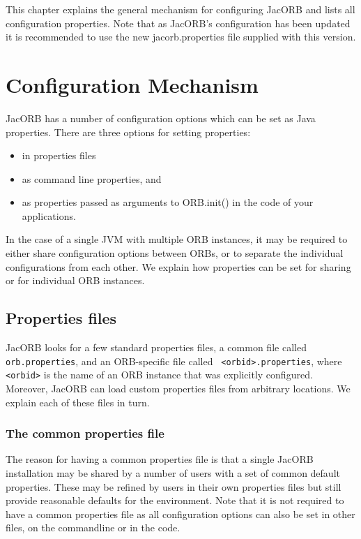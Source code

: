 %
%

This chapter explains the general mechanism for configuring JacORB
and lists all configuration properties. Note that as JacORB's
configuration has been updated it is recommended to use the new
jacorb.properties file supplied with this version.

\section{Configuration Mechanism}

JacORB has a number of configuration options which can be set as Java
properties. There are three options for setting properties:

\begin{itemize}
\item in properties files
\item as command line properties, and
\item as properties passed as arguments to ORB.init() in the code of your
  applications.
\end{itemize}

In the case of a single JVM with multiple ORB instances, it may be
required to either share configuration options between ORBs, or to
separate the individual configurations from each other. We explain how
properties can be set for sharing or for individual ORB instances.

\subsection{Properties files}

JacORB looks for a few standard properties files, a common file called
{\tt orb.properties}, and an ORB-specific file called {\tt
  <orbid>.properties}, where {\tt <orbid>} is the name of an ORB
instance that was explicitly configured. Moreover, JacORB can load
custom properties files from arbitrary locations. We explain each of
these files in turn.

\subsubsection{The common properties file}

The reason for having a common properties file is that a single JacORB
installation may be shared by a number of users with a set of common
default properties. These may be refined by users in their own
properties files but still provide reasonable defaults for the
environment. Note that it is not required to have a common properties
file as all configuration options can also be set in other files, on
the commandline or in the code.

